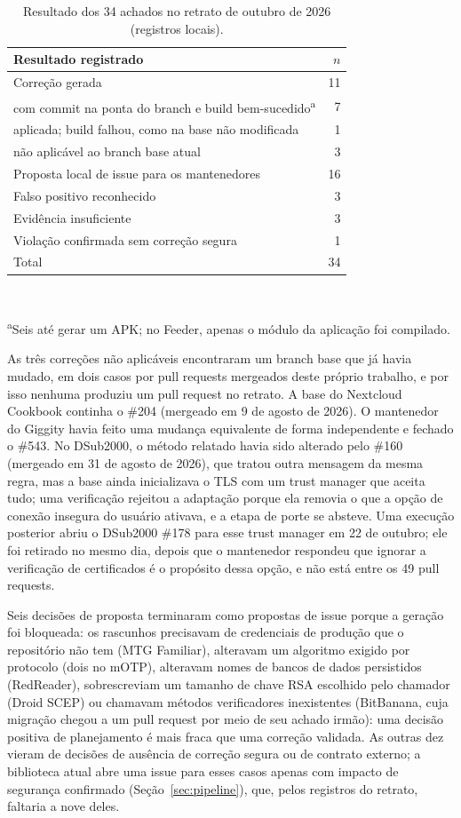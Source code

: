 \documentclass[conference]{IEEEtran}
\begin{document}
\begin{table}[H]
\centering
\caption{Resultado dos 34 achados no retrato de outubro de 2026 (registros
locais).}
\label{tab:adjudication}
\footnotesize
\begin{tabular}{p{6.1cm}r}
\toprule
Resultado registrado & $n$ \\
\midrule
Correção gerada & 11 \\
\quad com commit na ponta do branch e build bem-sucedido\textsuperscript{a} & 7 \\
\quad aplicada; build falhou, como na base não modificada & 1 \\
\quad não aplicável ao branch base atual & 3 \\
Proposta local de issue para os mantenedores & 16 \\
Falso positivo reconhecido & 3 \\
Evidência insuficiente & 3 \\
Violação confirmada sem correção segura & 1 \\
\midrule
Total & 34 \\
\bottomrule
\end{tabular}
\\[2pt]\raggedright\scriptsize\textsuperscript{a}Seis até gerar um APK; no Feeder,
apenas o módulo da aplicação foi compilado.
\end{table}

As três correções não aplicáveis encontraram um branch base que já havia mudado,
em dois casos por pull requests mergeados deste próprio trabalho, e por isso
nenhuma produziu um pull request no retrato. A base do Nextcloud Cookbook continha
o \#204 (mergeado em 9 de agosto de 2026). O mantenedor do Giggity havia feito uma
mudança equivalente de forma independente e fechado o \#543. No DSub2000, o método
relatado havia sido alterado pelo \#160 (mergeado em 31 de agosto de 2026), que
tratou outra mensagem da mesma regra, mas a base ainda inicializava o TLS com um
trust manager que aceita tudo; uma verificação rejeitou a adaptação porque ela
removia o que a opção de conexão insegura do usuário ativava, e a etapa de
porte se absteve. Uma execução posterior abriu o DSub2000 \#178 para esse
trust manager em 22 de outubro; ele foi retirado no mesmo dia, depois que o
mantenedor respondeu que ignorar a verificação de certificados é o propósito
dessa opção, e não está entre os 49 pull requests.

Seis decisões de proposta terminaram como propostas de issue porque a geração foi
bloqueada: os rascunhos precisavam de credenciais de produção que o repositório não tem (MTG
Familiar), alteravam um algoritmo exigido por protocolo (dois no mOTP), alteravam
nomes de bancos de dados persistidos (RedReader), sobrescreviam um tamanho de chave RSA escolhido pelo chamador
(Droid SCEP) ou chamavam métodos verificadores inexistentes (BitBanana, cuja
migração chegou a um pull request por meio de seu achado irmão): uma decisão positiva
de planejamento é mais fraca que uma correção validada. As outras dez vieram de
decisões de ausência de correção segura ou de contrato externo; a biblioteca atual abre uma
issue para esses casos apenas com impacto de segurança confirmado
(Seção~\ref{sec:pipeline}), que, pelos registros do retrato, faltaria a nove deles.
\end{document}
